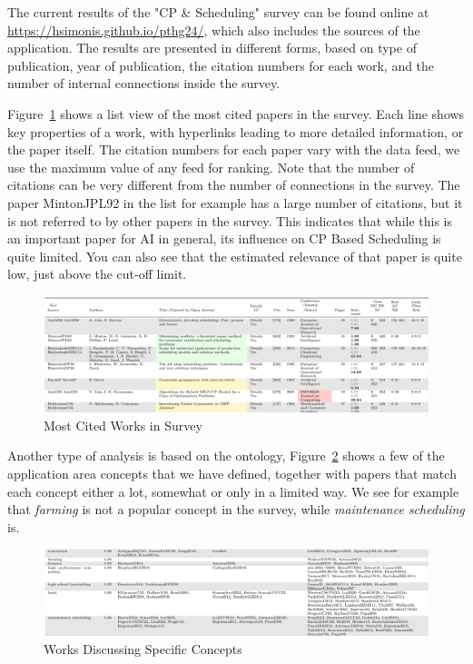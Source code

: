 \documentclass[
 hf]{ceurart}
\begin{document}
The current results of the "CP \& Scheduling" survey can be found online at 
\url{https://hsimonis.github.io/pthg24/}, 
which also includes the sources of the application. The results are presented in different forms, based on type of publication, year of publication, the citation numbers for each work, and the number of internal connections inside the survey.

Figure~\ref{fig:mostcited} shows a list view of the most cited papers in the survey. Each line shows key properties of a work, with hyperlinks leading to more detailed information, or the paper itself. The citation numbers for each paper vary with the data feed, we use the maximum value of any feed for ranking. Note that the number of citations can be very different from the number of connections in the survey. The paper MintonJPL92\cite{MintonJPL92} in the list for example has a large number of citations, but it is not referred to by other papers in the survey. This indicates that while this is an important paper for AI in general, its influence on CP Based Scheduling is quite limited. You can also see that the estimated relevance of that paper is quite low, just above the cut-off limit.
\begin{figure}[htbp]
\includegraphics[width=\textwidth]{images/mostcited}
\caption{\label{fig:mostcited}Most Cited Works in Survey}
\end{figure}

Another type of analysis is based on the ontology, Figure~\ref{fig:concepts} shows a few of the application area concepts that we have defined, together with papers that match each concept either a lot, somewhat or only in a limited way. We see for example that \emph{farming} is not a popular concept in the survey, while \emph{maintenance scheduling} is. 
\begin{figure}[htbp]
\includegraphics[width=\textwidth]{images/concepts}
\caption{\label{fig:concepts}Works Discussing Specific Concepts}
\end{figure}
\end{document}
